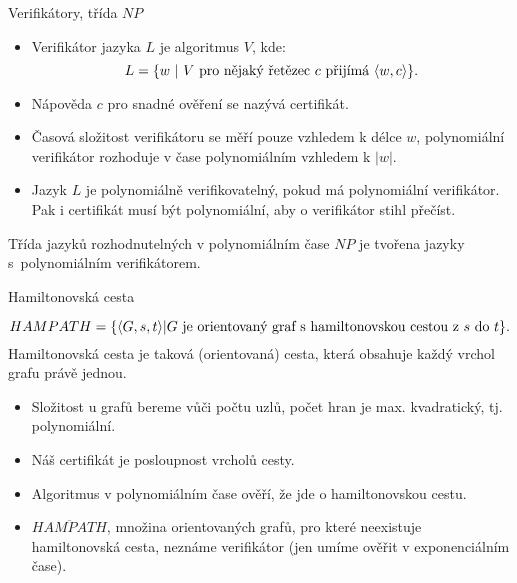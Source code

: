     
    
    \begin{frame}{Verifikátory, třída $NP$}
    
    \begin{definition}
    \begin{itemize}[<+->]
        \item 
    \alert{Verifikátor} jazyka $L$ je algoritmus $V$, kde:
    $$L=
    \{ w\ | \ V \hbox{ pro nějaký řetězec $c$ přijímá }\langle w,c\rangle \}\hbox{.}
    $$
    \item Nápověda $c$ pro snadné ověření se nazývá \alert{certifikát}.
    \item Časová složitost verifikátoru se měří pouze vzhledem k délce $w$, \alert{polynomiální verifikátor} rozhoduje v čase polynomiálním vzhledem k $|w|$.
    \item Jazyk $L$ je \alert{polynomiálně verifikovatelný}, pokud má polynomiální verifikátor. Pak i certifikát musí být polynomiální, aby o verifikátor stihl přečíst.
    \end{itemize}
    \end{definition}
    \pause
    \begin{definition}
     \alert{Třída jazyků rozhodnutelných v polynomiálním čase} \alert{$NP$ }  je tvořena jazyky s~polynomiálním verifikátorem.
    \end{definition}
    \end{frame}
    
    
    \begin{frame}{Hamiltonovská cesta}
    \begin{example}
        $$ HAMPATH=\{\langle G,s,t\rangle | G \hbox{ je orientovaný graf s hamiltonovskou cestou z } s \hbox{ do } t\}\hbox{.}$$
        Hamiltonovská cesta je taková (orientovaná) cesta, která obsahuje každý vrchol grafu právě jednou.
    \end{example}
    \pause
    \begin{itemize}[<+->]
        \item Složitost u grafů bereme vůči počtu uzlů, počet hran je max. kvadratický, tj. polynomiální.
        \item Náš certifikát je posloupnost vrcholů cesty.
        \item Algoritmus v polynomiálním čase ověří, že jde o hamiltonovskou cestu.
        \item $\overline{HAMPATH}$, množina orientovaných grafů, pro které neexistuje hamiltonovská cesta, neznáme verifikátor (jen umíme ověřit v exponenciálním čase).
    \end{itemize}
    \end{frame}
    
